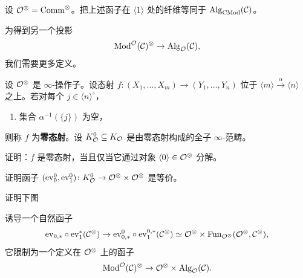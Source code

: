 \begin{exercise}\label{L23-3.4}
设 $\mathcal{O}^{\otimes}=\mathrm{Comm}^{\otimes}$。把上述函子在 $\langle1\rangle$ 处的纤维等同于 $\operatorname{Alg}_{\mathrm{CMod}}(\mathcal{C})$。
\end{exercise}

\nitem\label{L23-3.5} 为得到另一个投影
\[
\operatorname{Mod}^{\mathcal{O}}(\mathcal{C})^{\otimes}\to\operatorname{Alg}_{\mathcal{O}}(\mathcal{C}),
\]
我们需要更多定义。

\begin{definition}\label{L23-3.6}
设 $\mathcal{O}^{\otimes}$ 是 $\infty$-操作子。设态射 $f\colon(X_{1},\dots,X_{m})\to(Y_{1},\dots,Y_{n})$ 位于 $\langle m\rangle\xrightarrow{\alpha}\langle n\rangle$ 之上。若对每个 $j\in\langle n\rangle^{\circ}$，
\begin{enumerate}[label=(\alph*),leftmargin=2.4em,itemsep=0.1em]
\item 集合 $\alpha^{-1}(\{j\})$ 为空，
\end{enumerate}
则称 $f$ 为\textbf{零态射}。设 $K^{0}_{\mathcal{O}}\subseteq K_{\mathcal{O}}$ 是由零态射构成的全子 $\infty$-范畴。
\end{definition}


\begin{exercise}\label{L23-3.7}
证明：$f$ 是零态射，当且仅当它通过对象 $\langle0\rangle\in\mathcal{O}^{\otimes}$ 分解。
\end{exercise}

\begin{exercise}\label{L23-3.8}
证明函子 $(\mathrm{ev}_{0}^{0},\mathrm{ev}_{1}^{0})\colon K^{0}_{\mathcal{O}}\to\mathcal{O}^{\otimes}\times\mathcal{O}^{\otimes}$ 是等价。
\end{exercise}

\begin{exercise}\label{L23-3.9}
证明下图
\begin{center}
\end{center}
诱导一个自然函子
\[
\mathrm{ev}_{0,*}\circ\mathrm{ev}_{1}^{*}(\mathcal{C}^{\otimes})\to
\mathrm{ev}_{0,*}^{0}\circ\mathrm{ev}_{1}^{0,*}(\mathcal{C}^{\otimes})
\simeq\mathcal{O}^{\otimes}\times\operatorname{Fun}_{\mathcal{O}^{\otimes}}(\mathcal{O}^{\otimes},\mathcal{C}^{\otimes}),
\]
它限制为一个定义在 $\mathcal{O}^{\otimes}$ 上的函子
\[
\operatorname{Mod}^{\mathcal{O}}(\mathcal{C})^{\otimes}\to\mathcal{O}^{\otimes}\times\operatorname{Alg}_{\mathcal{O}}(\mathcal{C}).
\]
\end{exercise}

